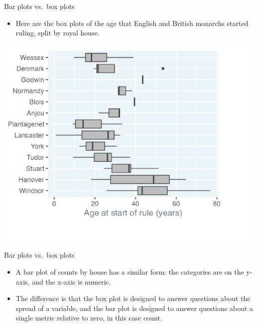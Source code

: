 \documentclass[
  ignorenonframetext,
]{beamer}
\providecommand{\tightlist}{%
  \setlength{\itemsep}{0pt}\setlength{\parskip}{0pt}}
\begin{document}
\begin{frame}{Bar plots vs.~box plots}
\label{bar-plots-vs.-box-plots-1}
\begin{itemize}
\tightlist
\item
  Here are the box plots of the age that English and British monarchs
  started ruling, split by royal house.
\end{itemize}

\includegraphics{../images/im55.png}
\end{frame}

\begin{frame}{Bar plots vs.~box plots}
\label{bar-plots-vs.-box-plots-2}
\begin{itemize}
\item
  A bar plot of counts by house has a similar form: the categories are
  on the y-axis, and the x-axis is numeric.
\item
  The difference is that the box plot is designed to answer questions
  about the spread of a variable, and the bar plot is designed to answer
  questions about a single metric relative to zero, in this case count.
\end{itemize}
\end{frame}
\end{document}
